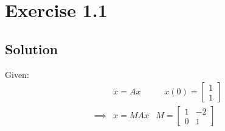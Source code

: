 \section*{Exercise 1.1}

\subsection*{Solution}

Given:
\begin{align*}
     &
    \dot x
    =
    A x
     &
    \quad
    x(0)
    =
    \begin{bmatrix}
        1 \\
        1
    \end{bmatrix}
    \\
    \implies
     &
    \dot x
    =
    M A x
     &
    M
    =
    \begin{bmatrix}
        1 & -2 \\
        0 & 1
    \end{bmatrix}
    \\
\end{align*}
